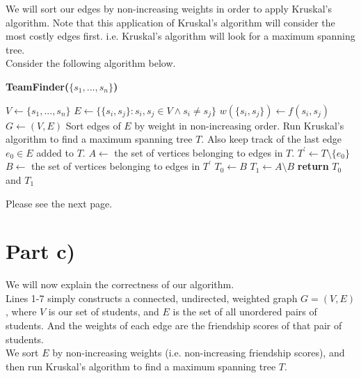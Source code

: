 \documentclass[12pt]{article}
\begin{document}
We will sort our edges by non-increasing weights in order to apply Kruskal's algorithm. Note that this application of Kruskal's algorithm will consider the most costly edges first. i.e. Kruskal's algorithm will look for a maximum spanning tree. \\

Consider the following algorithm below. 

\begin{algorithm}[hbt!]
\caption{\textbf{TeamFinder($\{s_1,...,s_n\}$)}}\label{alg:cap}

\begin{algorithmic}[1]
\State $V \gets \{s_1,...,s_n\}$
\State $E \gets \{\{s_i,s_j\}: s_i, s_j \in V \land s_i \neq s_j\}$
    \State $w(\{s_i,s_j\}) \gets f(s_i,s_j)$
\EndFor
\State
\State $G \gets (V,E)$ 
\State Sort edges of $E$ by weight in non-increasing order. 
\State Run Kruskal's algorithm to find a maximum spanning tree $T$. Also keep track of the last edge $e_0 \in E$ added to $T$. 
\State
\State $A \gets$ the set of vertices belonging to edges in $T$. 
\State
\State $T^\prime \gets T \setminus \{e_0\}$ 
\State $B \gets $ the set of vertices belonging to edges in $T^\prime$
\State
\State $T_0 \gets B$ 
\State $T_1 \gets A \setminus B$ 
\State
\State \textbf{return} $T_0$ and $T_1$
\end{algorithmic}
\end{algorithm}

Please see the next page. 

\newpage

\section*{Part c)}

We will now explain the correctness of our algorithm. \\


Lines 1-7 simply constructs a connected, undirected, weighted graph $G = (V,E)$, where $V$ is our set of students, and $E$ is the set of all unordered pairs of students. And the weights of each edge are the friendship scores of that pair of students. \\

We sort $E$ by non-increasing weights (i.e. non-increasing friendship scores), and then run Kruskal's algorithm to find a maximum spanning tree $T$. \\
\end{document}
